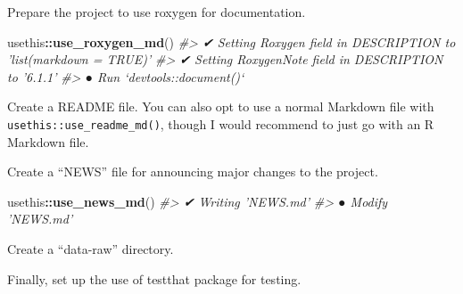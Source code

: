 \documentclass[]{book}
\newenvironment{Shaded}{\begin{snugshade}}{\end{snugshade}}
\newcommand{\CommentTok}[1]{\textcolor[rgb]{0.56,0.35,0.01}{\textit{#1}}}
\newcommand{\KeywordTok}[1]{\textcolor[rgb]{0.13,0.29,0.53}{\textbf{#1}}}
\newcommand{\NormalTok}[1]{#1}
\newcommand{\OperatorTok}[1]{\textcolor[rgb]{0.81,0.36,0.00}{\textbf{#1}}}
\begin{document}
Prepare the project to use roxygen for documentation.

\begin{Shaded}
\begin{Highlighting}[]
\NormalTok{usethis}\OperatorTok{::}\KeywordTok{use_roxygen_md}\NormalTok{()}
\CommentTok{#> ✔ Setting Roxygen field in DESCRIPTION to 'list(markdown = TRUE)'}
\CommentTok{#> ✔ Setting RoxygenNote field in DESCRIPTION to '6.1.1'}
\CommentTok{#> ● Run `devtools::document()`}
\end{Highlighting}
\end{Shaded}

Create a README file. You can also opt to use a normal Markdown file with \texttt{usethis::use\_readme\_md()}, though I would recommend to just go with an R Markdown file.

\begin{Shaded}
\end{Shaded}

Create a ``NEWS'' file for announcing major changes to the project.

\begin{Shaded}
\begin{Highlighting}[]
\NormalTok{usethis}\OperatorTok{::}\KeywordTok{use_news_md}\NormalTok{()}
\CommentTok{#> ✔ Writing 'NEWS.md'}
\CommentTok{#> ● Modify 'NEWS.md'}
\end{Highlighting}
\end{Shaded}

Create a ``data-raw'' directory.

\begin{Shaded}
\end{Shaded}

Finally, set up the use of testthat package for testing.
\end{document}
